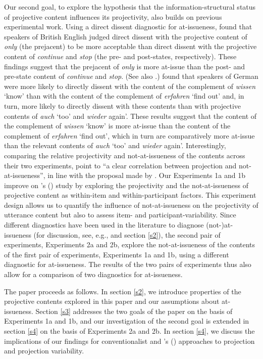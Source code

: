 \documentclass[11pt,fleqn]{article}
\newcommand{\6}{\mbox{$[\hspace*{-.6mm}[$}}
\newcommand{\9}{\mbox{$]\hspace*{-.6mm}]$}}
\newcommand{\citetpos}[1]{\citeauthor{#1}'s (\citeyear{#1})}
\begin{document}
Our second goal, to explore the hypothesis that the information-structural status of projective content influences its projectivity, also builds on previous experimental work. 
 Using a direct dissent diagnostic for at-issueness, \citet{amaral-etal11} found that speakers of British English judged direct dissent with the projective content of {\em only} (the prejacent) to be more acceptable than direct dissent with the projective content of {\em continue} and {\em stop} (the pre- and post-states, respectively). These findings suggest that the prejacent of {\em only} is more at-issue than the post- and pre-state content of {\em continue} and {\em stop}. (See also \citealt{cummins-etal2012}.) \citet{xue-onea11} found that speakers of German were more likely to directly dissent with the content of the complement of {\em wissen} `know' than with the content of the complement of {\em erfahren} `find out' and, in turn, more likely to directly dissent with these contents than with projective contents of {\em auch} `too' and {\em wieder} again'. These results suggest that the content of the complement of {\em wissen} `know' is more at-issue than the content of the complement of {\em erfahren} `find out', which in turn are comparatively more at-issue than the relevant contents of {\em auch} `too' and {\em wieder} again'. Interestingly, comparing the relative projectivity and not-at-issueness 
of the contents across their two experiments, \citet[180]{xue-onea11} point to ``a clear correlation between projection and not-at-issueness'', in line with the proposal made by \citealt{brst-salt10}. Our Experiments 1a and 1b improve on \citetpos{xue-onea11} study by exploring the projectivity and the not-at-issueness of projective content as within-item and within-participant factors. This experiment design allows us to quantify the influence of not-at-issueness on the projectivity of utterance content but also to assess item- and participant-variability. Since different diagnostics have been used in the literature to diagnose (not-)at-issueness (for discussion, see, e.g., \citealt{tonhauser-sula6} and section \ref{s2}), the second pair of experiments, Experiments 2a and 2b, explore the not-at-issueness of the contents of the first pair of experiments, Experiments 1a and 1b, using a different diagnostic for at-issueness. The results of the two pairs of experiments thus also allow for a comparison of two diagnostics for at-issueness.

The paper proceeds as follows. In section \ref{s2}, we introduce properties of the projective contents explored in this paper and our assumptions about at-issueness. Section \ref{s3} addresses the two goals of the paper on the basis of Experiments 1a and 1b, and our investigation of the second goal is extended in section \ref{s4} on the basis of Experiments 2a and 2b. In section \ref{s4}, we discuss the implications of our findings for conventionalist and \citetpos{brst-salt10} approaches to projection and projection variability.
\end{document}
